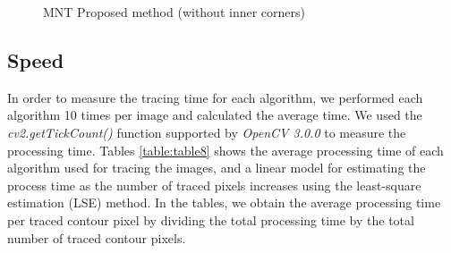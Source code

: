 \begin{figure}[htbp]
	\centering

	\caption{ \protect{} MNT \protect{} Proposed method (without inner corners)}
	\label{fig:image17}
\end{figure}


\subsection{Speed}


In order to measure the tracing time for each algorithm, we performed each algorithm 10 times per image and calculated the average time. We used the \textit{cv2.getTickCount()} function supported by \textit{OpenCV 3.0.0} to measure the processing time. Tables \ref{table:table8} shows the average processing time of each algorithm used for tracing the images, and a linear model for estimating the process time as the number of traced pixels increases using the least-square estimation (LSE) method. In the tables, we obtain the average processing time per traced contour pixel by dividing the total processing time by the total number of traced contour pixels.

